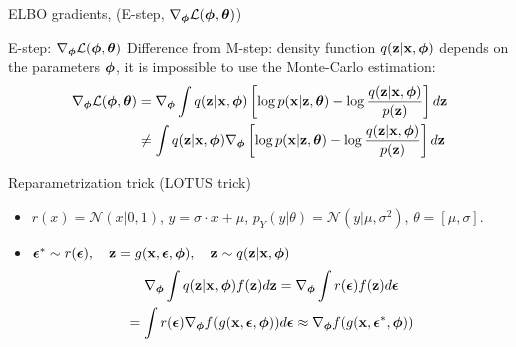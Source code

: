 	\begin{frame}{ELBO gradients, (E-step, $\nabla_{\boldsymbol{\phi}} \mathcal{L}(\boldsymbol{\phi}, \boldsymbol{\theta})$)}
		\begin{block}{E-step: $\nabla_{\boldsymbol{\phi}} \mathcal{L}(\boldsymbol{\phi}, \boldsymbol{\theta})$}
			Difference from M-step: density function $q(\mathbf{z}| \mathbf{x}, \boldsymbol{\phi})$ depends on the parameters $\boldsymbol{\phi}$, it is impossible to use the Monte-Carlo estimation:
			\begin{align*}
				\nabla_{\boldsymbol{\phi}} \mathcal{L} (\boldsymbol{\phi}, \boldsymbol{\theta}) &= \nabla_{\boldsymbol{\phi}} \int q(\mathbf{z} | \mathbf{x}, \boldsymbol{\phi}) \left[\log p(\mathbf{x} | \mathbf{z}, \boldsymbol{\theta}) - \log \frac{q(\mathbf{z}| \mathbf{x}, \boldsymbol{\phi})}{p(\mathbf{z})} \right] d \mathbf{z} \\
				& \neq  \int q(\mathbf{z} | \mathbf{x}, \boldsymbol{\phi}) \nabla_{\boldsymbol{\phi}} \left[\log p(\mathbf{x} | \mathbf{z}, \boldsymbol{\theta}) - \log \frac{q(\mathbf{z}| \mathbf{x}, \boldsymbol{\phi})}{p(\mathbf{z})} \right] d \mathbf{z} 
			\end{align*}
		\end{block}
		\vspace{-0.5cm}
		\begin{block}{Reparametrization trick (LOTUS trick)} 
			\begin{itemize}
				\item $r(x) = \mathcal{N}(x|0, 1)$, $y = \sigma \cdot x + \mu$, $p_Y(y|\theta) = \mathcal{N}(y| \mu, \sigma^2)$, $\theta = [\mu, \sigma]$.
				
				\item $\boldsymbol{\epsilon}^* \sim r(\boldsymbol{\epsilon}), \quad \mathbf{z} = g(\mathbf{x}, \boldsymbol{\epsilon}, \boldsymbol{\phi}), \quad \mathbf{z} \sim q(\mathbf{z} | \mathbf{x}, \boldsymbol{\phi})$
				\vspace{-0.3cm}
				\begin{multline*}
					\nabla_{\boldsymbol{\phi}}\int q(\mathbf{z}|\mathbf{x}, \boldsymbol{\phi}) f(\mathbf{z}) d\mathbf{z} = \nabla_{\boldsymbol{\phi}}\int r(\boldsymbol{\epsilon})  f(\mathbf{z}) d\boldsymbol{\epsilon} \\ = \int r(\boldsymbol{\epsilon}) \nabla_{\boldsymbol{\phi}} f(g(\mathbf{x}, \boldsymbol{\epsilon}, \boldsymbol{\phi})) d\boldsymbol{\epsilon} \approx \nabla_{\boldsymbol{\phi}} f(g(\mathbf{x}, \boldsymbol{\epsilon}^*, \boldsymbol{\phi}))
				\end{multline*}
			\end{itemize}
		\end{block}
	\end{frame}
